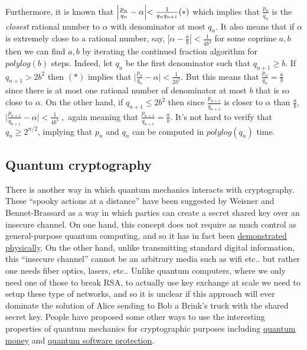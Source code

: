 Furthermore, it is known that
\(\Bigl|\tfrac{p_n}{q_n} - \alpha\Bigl| < \tfrac{1}{q_nq_{n+1}} (*)\)
which implies that \(\tfrac{p_n}{q_n}\) is the \emph{closest} rational
number to \(\alpha\) with denominator at most \(q_n\). It also means
that if \(\alpha\) is extremely close to a rational number, say,
\(\left|\alpha - \tfrac{a}{b} \right| < \tfrac{1}{4b^4}\) for some
coprime \(a,b\) then we can find \(a,b\) by iterating the continued
fraction algorithm for \(polylog(b)\) steps. Indeed, let \(q_n\) be the
first denominator such that \(q_{n+1} \geq b\). If \(q_{n+1} > 2b^2\)
then \((*)\) implies that
\(\bigl|\tfrac{p_n}{q_n}-\alpha\bigr| < \tfrac{1}{2b^2}\). But this
means that \(\tfrac{p_n}{q_n} = \tfrac{a}{b}\) since there is at most
one rational number of denominator at most \(b\) that is so close to
\(\alpha\). On the other hand, if \(q_{n+1} \leq 2b^2\) then since
\(\tfrac{p_{n+1}}{q_{n+1}}\) is closer to \(\alpha\) than
\(\tfrac{a}{b}\),
\(\bigl|\tfrac{p_{n+1}}{q_{n+1}}-\alpha\bigr| < \tfrac{1}{4b^4}\;,\)
again meaning that \(\tfrac{p_{n+1}}{q_{n+1}}=\tfrac{a}{b}\). It's not
hard to verify that \(q_n \geq 2^{n/2}\), implying that \(p_n\) and
\(q_n\) can be computed in \(polylog(q_n)\) time.

\subsection{Quantum cryptography}\label{19-Quantum-cryptography}

There is another way in which quantum mechanics interacts with
cryptography. These ``spooky actions at a distance'' have been suggested
by Weisner and Bennet-Brassard as a way in which parties can create a
secret shared key over an insecure channel. On one hand, this concept
does not require as much control as general-purpose quantum computing,
and so it has in fact been
\href{https://en.wikipedia.org/wiki/Quantum_key_distribution\#Quantum_Key_Distribution_Networks}{demonstrated
physically}. On the other hand, unlike transmitting standard digital
information, this ``insecure channel'' cannot be an arbitrary media such
as wifi etc.. but rather one needs fiber optics, lasers, etc.. Unlike
quantum computers, where we only need one of those to break RSA, to
actually use key exchange at scale we need to setup these type of
networks, and so it is unclear if this approach will ever dominate the
solution of Alice sending to Bob a Brink's truck with the shared secret
key. People have proposed some other ways to use the interesting
properties of quantum mechanics for cryptographic purposes including
\href{https://en.wikipedia.org/wiki/Quantum_money}{quantum money} and
\href{http://www.scottaaronson.com/papers/noclone-ccc.pdf}{quantum
software protection}.
